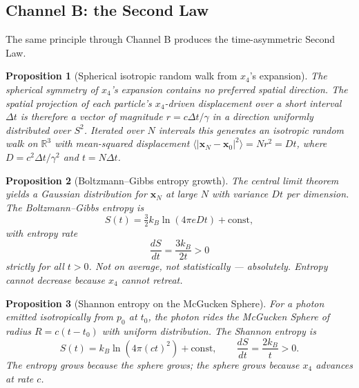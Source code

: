 \documentclass[11pt,a4paper]{article}
\newtheorem{proposition}{Proposition}
\begin{document}
\subsection{Channel B: the Second Law}

The same principle through Channel B produces the time-asymmetric Second Law.

\begin{proposition}[Spherical isotropic random walk from $x_4$'s expansion]
\label{prop:random walk}
The spherical symmetry of $x_4$'s expansion contains no preferred spatial direction. The spatial projection of each particle's $x_4$-driven displacement over a short interval $\Delta t$ is therefore a vector of magnitude $r = c\Delta t/\gamma$ in a direction uniformly distributed over $S^2$. Iterated over $N$ intervals this generates an isotropic random walk on $\mathbb{R}^3$ with mean-squared displacement $\langle |\mathbf{x}_N - \mathbf{x}_0|^2 \rangle = N r^2 = Dt$, where $D = c^2 \Delta t/\gamma^2$ and $t = N\Delta t$.
\end{proposition}

\begin{proposition}[Boltzmann--Gibbs entropy growth]
\label{prop:bgentropy}
The central limit theorem yields a Gaussian distribution for $\mathbf{x}_N$ at large $N$ with variance $Dt$ per dimension. The Boltzmann--Gibbs entropy is
\begin{equation}
S(t) = \tfrac{3}{2} k_B \ln(4\pi e D t) + \text{const},
\end{equation}
with entropy rate
\begin{equation}
\frac{dS}{dt} = \frac{3k_B}{2t} > 0
\end{equation}
\emph{strictly} for all $t > 0$. Not on average, not statistically --- absolutely. Entropy cannot decrease because $x_4$ cannot retreat.
\end{proposition}

\begin{proposition}[Shannon entropy on the McGucken Sphere]
\label{prop:photonentropy}
For a photon emitted isotropically from $p_0$ at $t_0$, the photon rides the McGucken Sphere of radius $R = c(t-t_0)$ with uniform distribution. The Shannon entropy is
\begin{equation}
S(t) = k_B \ln(4\pi (ct)^2) + \text{const}, \qquad \frac{dS}{dt} = \frac{2 k_B}{t} > 0.
\end{equation}
The entropy grows because the sphere grows; the sphere grows because $x_4$ advances at rate $c$.
\end{proposition}
\end{document}
